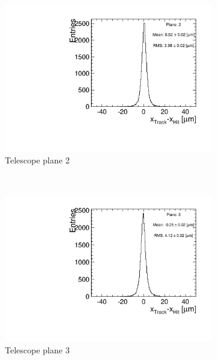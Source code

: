 \begin{figure}[htbp]
\begin{subfigure}[b]{0.3\textwidth}
    \includegraphics[width=\textwidth]{figures/Telescope/biasedResiduals/BiasedResiduals_run77_PlaneXRMS2.pdf}
    \caption{Telescope plane 2}
  \end{subfigure} \\
  \begin{subfigure}[b]{0.3\textwidth}
    \includegraphics[width=\textwidth]{figures/Telescope/biasedResiduals/BiasedResiduals_run77_PlaneXRMS3.pdf}
    \caption{Telescope plane 3}
  \end{subfigure}\hfill
  \begin{subfigure}[b]{0.3\textwidth}

\end{subfigure}
\end{figure}
